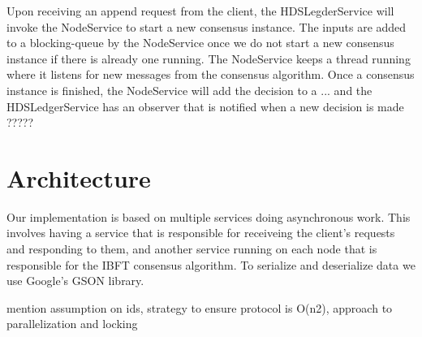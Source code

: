 \documentclass{article}
\begin{document}
Upon receiving an append request from the client, the HDSLegderService will invoke the NodeService to start a new 
consensus instance. The inputs are added to a blocking-queue by the NodeService once we do not start a new consensus 
instance if there is already one running. The NodeService keeps a thread running where it listens for new messages 
from the consensus algorithm. Once a consensus instance is finished, the NodeService will add the decision to a 
... and the HDSLedgerService has an observer that is notified when a new decision is made ?????

\section{Architecture}
Our implementation is based on multiple services doing asynchronous work. This 
involves having a service that is responsible for receiveing the client's requests and responding to 
them, and another service running on each node that is responsible for the IBFT consensus algorithm.
To serialize and deserialize data we use Google's GSON library.

mention assumption on ids,
strategy to ensure protocol is O(n2), 
approach to parallelization and locking


\newpage



% 

\end{document}
